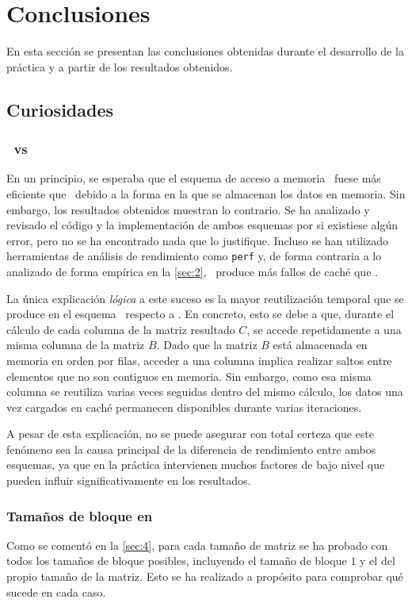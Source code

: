 \pagestyle{fancy}
\fancyhead[l]{\autorUO}
\fancyfoot[l]{\asignaturaAbbr}
\fancyfoot[r]{\fecha}

\section{Conclusiones} \label{sec:5}
En esta sección se presentan las conclusiones obtenidas durante el desarrollo de la práctica y 
a partir de los resultados obtenidos.


\subsection{Curiosidades}
\subsubsection{\rowmajor\ vs \colmajor} \label{subsec:5.1}
En un principio, se esperaba que el esquema de acceso a memoria \rowmajor\ fuese más eficiente que \colmajor\ debido a la forma en la que se almacenan los datos en memoria.
Sin embargo, los resultados obtenidos muestran lo contrario. Se ha analizado y revisado el código y la implementación de ambos esquemas por 
si existiese algún error, pero no se ha encontrado nada que lo justifique. Incluso se han utilizado herramientas de análisis de rendimiento como \texttt{perf} 
y, de forma contraria a lo analizado de forma empírica en la \autoref{sec:2}, \rowmajor\ produce más fallos de caché que \colmajor.

La única explicación \textit{lógica} a este suceso es la mayor reutilización temporal que se produce en el esquema \colmajor\ respecto a \rowmajor. 
En concreto, esto se debe a que, durante el cálculo de cada columna de la matriz resultado \( C \), se accede repetidamente a una misma columna de la matriz \( B \). 
Dado que la matriz \( B \) está almacenada en memoria en orden por filas, acceder a una columna implica realizar saltos entre elementos que no son contiguos en memoria.
Sin embargo, como esa misma columna se reutiliza varias veces seguidas dentro del mismo cálculo, los datos una vez cargados en caché permanecen disponibles durante varias iteraciones.

A pesar de esta explicación, no se puede asegurar con total certeza que este fenómeno sea la causa principal de la diferencia de rendimiento entre ambos esquemas, 
ya que en la práctica intervienen muchos factores de bajo nivel que pueden influir significativamente en los resultados.


\subsubsection{Tamaños de bloque en \zorder}
Como se comentó en la \autoref{sec:4}, para cada tamaño de matriz se ha probado con todos los tamaños de bloque posibles, incluyendo el tamaño de bloque \(1\) y el del propio tamaño de la matriz.
Esto se ha realizado a propósito para comprobar qué sucede en cada caso. 

